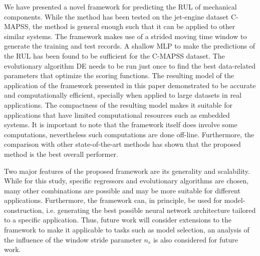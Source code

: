 \documentclass[preprint,12pt]{elsarticle}%
\begin{document}
We have presented a novel framework for predicting the RUL of mechanical
components. While the method has been tested on the jet-engine dataset
C-MAPSS, the method is general enough such that it can be applied to other similar
systems. The framework makes use of a strided moving time window to generate
the training and test records. A shallow MLP to make the predictions of the RUL
has been found to be sufficient for the C-MAPSS dataset. The evolutionary
algorithm DE needs to be run just once to find the best data-related
parameters that optimize the scoring functions. The resulting model of the application of the framework presented in this
paper demonstrated to be accurate and computationally
efficient, specially when applied to large datasets in real applications. The compactness of the resulting model makes it suitable for applications that have
limited computational resources such as embedded systems. It is important to note that the framework itself does involve some computations, nevertheless such computations are done off-line. Furthermore, the
comparison with other state-of-the-art methods has shown that the proposed
method is the best overall performer.

Two major features of the proposed framework are its generality and
scalability. While for this study, specific regressors and evolutionary
algorithms are chosen, many other combinations are possible and may be more
suitable for different applications. Furthermore, the framework can, in
principle, be used for model-construction, i.e. generating the best possible
neural network architecture tailored to a specific application. Thus, future work will consider extensions to the framework to make it applicable to tasks such as model selection, an analysis of the influence of the window stride parameter $n_s$ is also considered for future work.



%

%


\clearpage


\onecolumn%


\bigskip%
\end{document}
